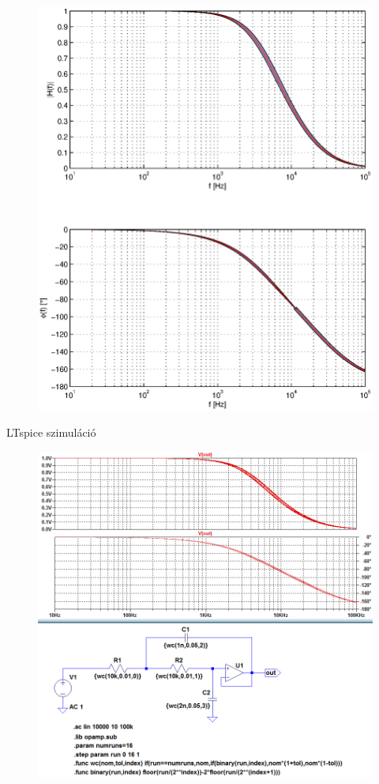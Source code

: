 \documentclass[12pt,a4paper]{report}
\begin{document}
\begin{figure}[H]
	\centering
	\includegraphics{output.eps}
\end{figure}

\clearpage

{\centering\huge LTspice szimul\'{a}ci\'{o}\\}

\begin{figure}[H]
	\centering
	\includegraphics[scale=0.5]{ltspice.png}
\end{figure}
\end{document}
